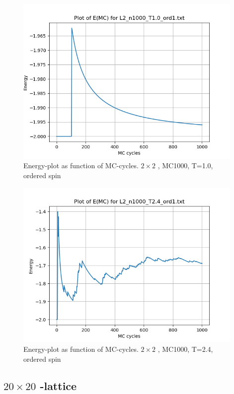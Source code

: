\documentclass{article}
\begin{document}
\begin{figure}[ht]
    \centering
    \includegraphics[width = 11cm]{img/energy_L2_n1000_T10_ord1.png}
    \caption{Energy-plot as function of MC-cycles. \texorpdfstring{ $2 \times 2$ }{text}, MC1000, T=1.0, ordered spin}
    \label{fig:energy_L2_n1000_T1.0_ord1}
  \end{figure}

\begin{figure}[ht]
    \centering
    \includegraphics[width = 11cm]{img/energy_L2_n1000_T24_ord1.png}
    \caption{Energy-plot as function of MC-cycles. \texorpdfstring{ $2 \times 2$ }{text}, MC1000, T=2.4, ordered spin}
    \label{fig:energy_L2_n1000_T2.4_ord1}
  \end{figure}

\subsection{\texorpdfstring{ $20 \times 20$ }{text}-lattice}
\end{document}
